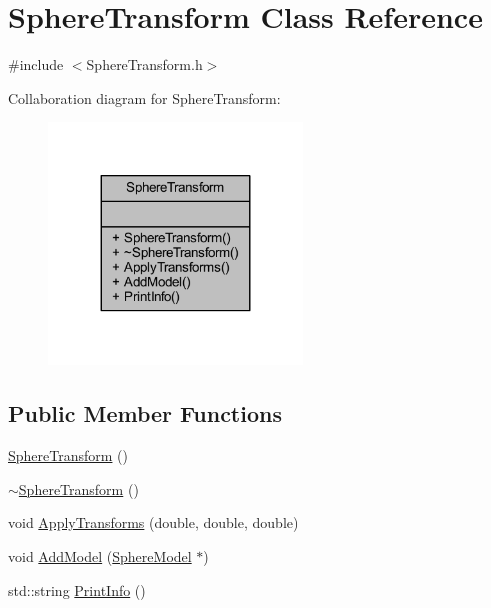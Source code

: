 \hypertarget{class_sphere_transform}{}\section{Sphere\+Transform Class Reference}
\label{class_sphere_transform}


{\ttfamily \#include $<$Sphere\+Transform.\+h$>$}



Collaboration diagram for Sphere\+Transform\+:
\nopagebreak
\begin{figure}[H]
\begin{center}
\leavevmode
\includegraphics[width=191pt]{class_sphere_transform__coll__graph}
\end{center}
\end{figure}
\subsection*{Public Member Functions}
\begin{DoxyCompactItemize}
\item 
\mbox{\hyperlink{class_sphere_transform_a0e4a906dda31dc3bdf36098e147dca5a}{Sphere\+Transform}} ()
\item 
\mbox{\hyperlink{class_sphere_transform_a7edb4e09f5df299e73121b35647b665d}{$\sim$\+Sphere\+Transform}} ()
\item 
void \mbox{\hyperlink{class_sphere_transform_af8719b3fcc492e786ab399bd149bd402}{Apply\+Transforms}} (double, double, double)
\item 
void \mbox{\hyperlink{class_sphere_transform_a77f692a85c566d476a974951e961c22b}{Add\+Model}} (\mbox{\hyperlink{class_sphere_model}{Sphere\+Model}} $\ast$)
\item 
std\+::string \mbox{\hyperlink{class_sphere_transform_adbcb07243dd43a521a78fd6b23c9cea5}{Print\+Info}} ()
\end{DoxyCompactItemize}


